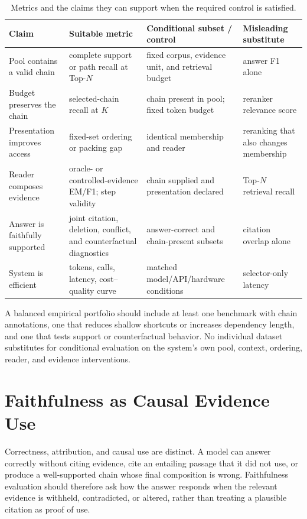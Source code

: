 \documentclass[manuscript,review]{acmart}
\theoremstyle{definition}
\theoremstyle{plain}
\theoremstyle{remark}
\begin{document}
\begin{table}[t]
\caption{Metrics and the claims they can support when the required control is
satisfied.}
\label{tab:metric_estimand_alignment}
\centering
\scriptsize
\begin{tabularx}{\linewidth}{@{}p{2.5cm}p{3.0cm}p{2.8cm}Y@{}}
\toprule
Claim & Suitable metric & Conditional subset / control & Misleading substitute \\
\midrule
Pool contains a valid chain & complete support or path recall at Top-$N$ & fixed corpus, evidence unit, and retrieval budget & answer F1 alone \\
Budget preserves the chain & selected-chain recall at $K$ & chain present in pool; fixed token budget & reranker relevance score \\
Presentation improves access & fixed-set ordering or packing gap & identical membership and reader & reranking that also changes membership \\
Reader composes evidence & oracle- or controlled-evidence EM/F1; step validity & chain supplied and presentation declared & Top-$N$ retrieval recall \\
Answer is faithfully supported & joint citation, deletion, conflict, and counterfactual diagnostics & answer-correct and chain-present subsets & citation overlap alone \\
System is efficient & tokens, calls, latency, cost--quality curve & matched model/API/hardware conditions & selector-only latency \\
\bottomrule
\end{tabularx}
\end{table}

A balanced empirical portfolio should include at least one benchmark with
chain annotations, one that reduces shallow shortcuts or increases dependency
length, and one that tests support or counterfactual behavior. No individual
dataset substitutes for conditional evaluation on the system's own pool,
context, ordering, reader, and evidence interventions.

\section{Faithfulness as Causal Evidence Use}
\label{sec:causal_faithfulness}

Correctness, attribution, and causal use are distinct. A model can answer
correctly without citing evidence, cite an entailing passage that it did not
use, or produce a well-supported chain whose final composition is wrong.
Faithfulness evaluation should therefore ask how the answer responds when the
relevant evidence is withheld, contradicted, or altered, rather than treating
a plausible citation as proof of use.
\end{document}
